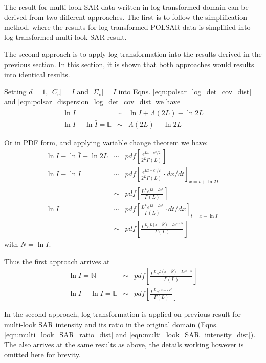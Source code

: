 \documentclass[journal]{IEEEtran}
\begin{document}
The result for multi-look SAR data written in log-transformed domain can be derived from two different approaches.
The first is to follow the simplification method, where the results for log-transformed POLSAR data is simplified into log-transformed multi-look SAR result.

The second approach is to apply log-transformation into the results derived in the previous section.
In this section, it is shown that both approaches would results into identical results.

Setting $d=1$, $|C_v|=I$ and $|\Sigma_v|=\bar{I}$ into Eqns. \ref{eqn:polsar_log_det_cov_dist} and \ref{eqn:polsar_dispersion_log_det_cov_dist}
we have
\begin{eqnarray*}
  \ln{I} &\sim& \ln{\bar{I}} + \Lambda(2L) - \ln{2L}  \\
  \ln{I} - \ln{\bar{I}} = \mathbb{L} &\sim& \Lambda(2L) - \ln{2L} 
\end{eqnarray*}

Or in PDF form, and applying variable change theorem we have:
\begin{eqnarray*}
  \ln{I} - \ln{\bar{I}} + \ln{2L} &\sim& pdf \left[ \frac{e^{Lx-e^x/2}}{2^L \Gamma(L)} \right] \\
  \ln{I} - \ln{\bar{I}} &\sim& pdf \left[ \frac{e^{Lx-e^x/2}}{2^L \Gamma(L)} \cdot dx/dt \right]_{x=t+\ln{2L}} \\
   &\sim& pdf \left[ \frac{L^Le^{Lt-Le^t}}{ \Gamma(L)}  \right] \\
  \ln{I} &\sim&  pdf \left[ \frac{L^Le^{Lt-Le^t}}{ \Gamma(L)} \cdot dt/dx \right]_{t=x-\ln{\bar{I}}} \\
 &\sim&  pdf \left[ \frac{L^Le^{L(x-\bar{N})-Le^{x-\bar{N}}}}{ \Gamma(L)} \right] 
\end{eqnarray*}
with $\bar{N} = \ln{\bar{I}}$.

Thus the first approach arrives at
\begin{eqnarray}
   \ln{I} = \mathbb{N} &\sim&  pdf \left[ \frac{L^Le^{L(x-\bar{N})-Le^{x-\bar{N}}}}{ \Gamma(L)} \right] \\
   \ln{I} - \ln{\bar{I}} = \mathbb{L} &\sim& pdf \left[ \frac{L^Le^{Lt-Le^t}}{ \Gamma(L)}  \right]  
\end{eqnarray}

In the second approach, log-transformation is applied on previous result for multi-look SAR intensity and its ratio in the original domain (Eqns. \ref{eqn:multi_look_SAR_ratio_dist} and \ref{eqn:multi_look_SAR_intensity_dist}).
The also arrives at the same results as above, the details working however is omitted here for brevity.
\end{document}
